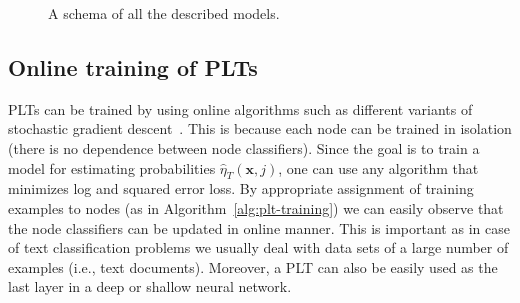 \documentclass{article}
\newcommand{\Algo}[1]{\textsc{#1}}
\renewcommand{\vec}[1]{\boldsymbol{#1}}
\newcommand{\bx}{\vec{x}}
\newcommand{\by}{\vec{y}}
\newcommand{\heta}{\hat{\eta}}
\newcommand{\Path}[1]{\mathrm{Path}(#1)}
\newcommand{\sectionBefore}{-0pt}
\newcommand{\sectionAfter}{-0pt}
\begin{document}
\begin{figure}
	\begin{center}
		
	\end{center}
	\caption{A schema of all the described models.}
	\label{pic:module-repres-module-tag}
\end{figure}


\vspace{\sectionBefore}
\subsection{Online training of PLTs}
\label{sec:online_PLTs}
\vspace{\sectionAfter}

PLTs can be trained by using online algorithms such as different variants of stochastic gradient descent~\citep{Bottou_2010}. This is because each node can be trained in isolation (there is no dependence between node classifiers). Since the goal is to train a model for estimating probabilities $\heta_T(\bx,j)$, one can use any algorithm that minimizes log and squared error loss. By appropriate assignment of training examples to nodes (as in Algorithm~\ref{alg:plt-training}) we can easily observe that the node classifiers can be updated in online manner. 
This is important as in case of text classification problems we usually deal with data sets of a large number of examples (i.e., text documents). Moreover, a PLT can also be easily used as the last layer in a deep or shallow neural network. 

%	


\vspace{\sectionBefore}
\end{document}
